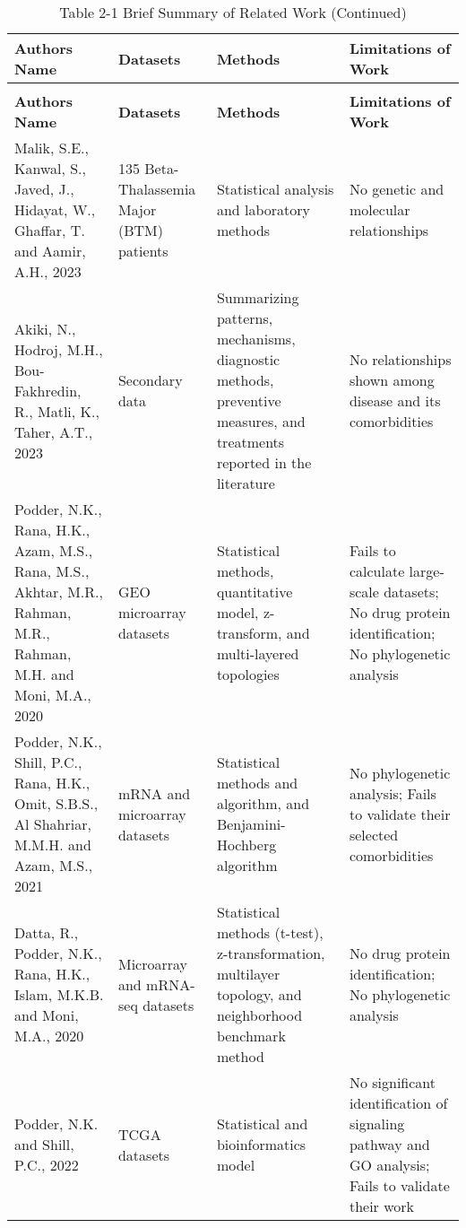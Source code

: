 \vspace{5mm} %
\begin{longtable}{|p{3.8cm}|p{2.5cm}|p{3.4cm}|p{3.4cm}|}
\caption{Table 2-1 Brief Summary of Related Work} \label{tab:2.1} \\
\hline
\textbf{Authors Name} & \textbf{Datasets} & \textbf{Methods} & \textbf{Limitations of Work} \\
\hline
\endfirsthead
\caption[]{Table 2-1 Brief Summary of Related Work (Continued)} \\
\hline
\textbf{Authors Name} & \textbf{Datasets} & \textbf{Methods} & \textbf{Limitations of Work} \\
\hline
\endhead
\hline
\endfoot
Malik, S.E., Kanwal, S., Javed, J., Hidayat, W., Ghaffar, T. and Aamir, A.H., 2023 \cite{b1} & 135 Beta-Thalassemia Major (BTM) patients & Statistical analysis and laboratory methods & No genetic and molecular relationships \\
\hline
Akiki, N., Hodroj, M.H., Bou-Fakhredin, R., Matli, K., Taher, A.T., 2023 \cite{b2} & Secondary data & Summarizing patterns, mechanisms, diagnostic methods, preventive measures, and treatments reported in the literature & No relationships shown among disease and its comorbidities \\
\hline
Podder, N.K., Rana, H.K., Azam, M.S., Rana, M.S., Akhtar, M.R., Rahman, M.R., Rahman, M.H. and Moni, M.A., 2020 \cite{b3} & GEO microarray datasets & Statistical methods, quantitative model, z-transform, and multi-layered topologies & Fails to calculate large-scale datasets; No drug protein identification; No phylogenetic analysis \\
\hline
Podder, N.K., Shill, P.C., Rana, H.K., Omit, S.B.S., Al Shahriar, M.M.H. and Azam, M.S., 2021 \cite{b4} & mRNA and microarray datasets & Statistical methods and algorithm, and Benjamini-Hochberg algorithm & No phylogenetic analysis; Fails to validate their selected comorbidities \\
\hline
Datta, R., Podder, N.K., Rana, H.K., Islam, M.K.B. and Moni, M.A., 2020 \cite{b7} & Microarray and mRNA-seq datasets & Statistical methods (t-test), z-transformation, multilayer topology, and neighborhood benchmark method & No drug protein identification; No phylogenetic analysis \\
\hline
Podder, N.K. and Shill, P.C., 2022 \cite{b8} & TCGA datasets & Statistical and bioinformatics model & No significant identification of signaling pathway and GO analysis; Fails to validate their work \\

\end{longtable}
